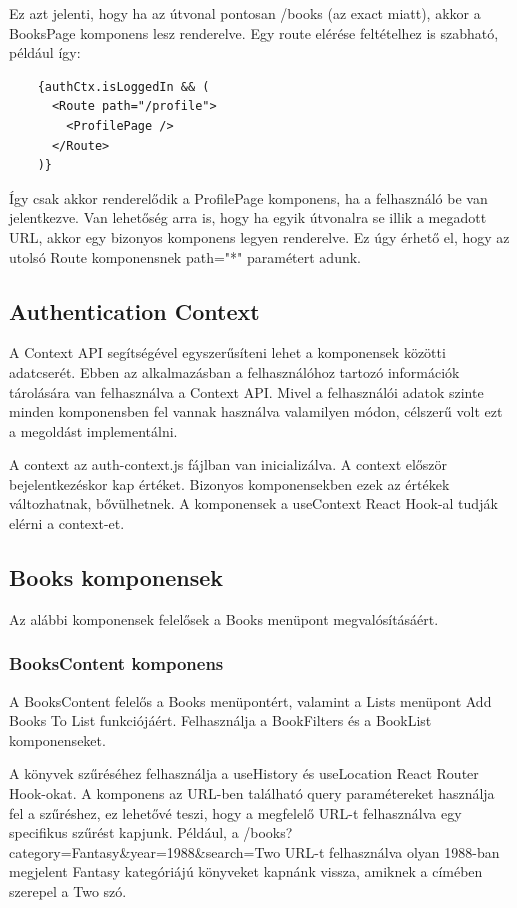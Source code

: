 Ez azt jelenti, hogy ha az útvonal pontosan /books (az exact miatt), akkor a BooksPage komponens lesz renderelve. Egy route elérése feltételhez is szabható, például így: 
\begin{lstlisting}
    {authCtx.isLoggedIn && (
      <Route path="/profile">
        <ProfilePage />
      </Route>
    )}
\end{lstlisting}

Így csak akkor renderelődik a ProfilePage komponens, ha a felhasználó be van jelentkezve. Van lehetőség arra is, hogy ha egyik útvonalra se illik a megadott URL, akkor egy bizonyos komponens legyen renderelve. Ez úgy érhető el, hogy az utolsó Route komponensnek path="*" paramétert adunk.

\subsection{Authentication Context}
A Context API segítségével egyszerűsíteni lehet a komponensek közötti adatcserét. Ebben az alkalmazásban a felhasználóhoz tartozó információk tárolására van felhasználva a Context API. Mivel a felhasználói adatok szinte minden komponensben fel vannak használva valamilyen módon, célszerű volt ezt a megoldást implementálni. 

\bigskip

A context az auth-context.js fájlban van inicializálva. A context először bejelentkezéskor kap értéket. Bizonyos komponensekben ezek az értékek változhatnak, bővülhetnek. A komponensek a useContext React Hook-al tudják elérni a context-et.

\subsection{Books komponensek}
Az alábbi komponensek felelősek a Books menüpont megvalósításáért.

\subsubsection{BooksContent komponens}
A BooksContent felelős a Books menüpontért, valamint a Lists menüpont Add Books To List funkciójáért. Felhasználja a BookFilters és a BookList komponenseket.

\bigskip

A könyvek szűréséhez felhasználja a useHistory és useLocation React Router Hook-okat. A komponens az URL-ben található query paramétereket használja fel a szűréshez, ez lehetővé teszi, hogy a megfelelő URL-t felhasználva egy specifikus szűrést kapjunk. Például, a /books?category=Fantasy\&year=1988\&search=Two  URL-t felhasználva olyan 1988-ban megjelent Fantasy kategóriájú könyveket kapnánk vissza, amiknek a címében szerepel a Two szó.

